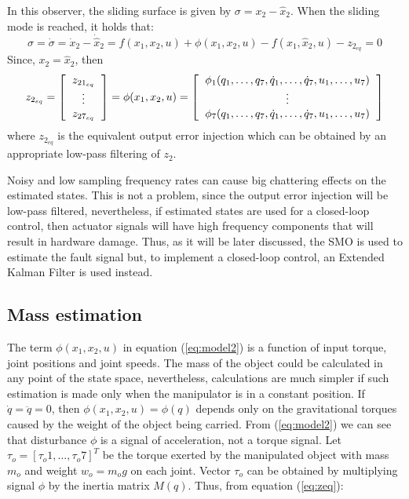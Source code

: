 \documentclass[a4paper, 10pt]{article}
\begin{document}
In this observer, the sliding surface is given by $\sigma = x_2 - \hat{x}_2$. When the sliding mode is reached, it holds that:
\[\sigma = \dot{\sigma} = \dot{x}_2 - \dot{\hat{x}}_2 = f(x_1, x_2, u) + \phi(x_1, x_2, u) - f(x_1, \hat{x}_2, u) - z_{2_{eq}} = 0\]
Since,  $x_2 = \hat{x}_2$, then
\begin{equation}
  z_{2_{eq}} = \left[\begin{tabular}{c}
      $z_{21_{eq}}$\\
      $\vdots$\\
      $z_{27_{eq}}$
    \end{tabular}\right] = \phi(x_1, x_2, u) =
  \left[\begin{tabular}{c}
      $\phi_1(q_1,\dots, q_7, \dot{q}_1, \dots, \dot{q}_7, u_1, \dots,u_7)$\\
      $\vdots$\\
      $\phi_7(q_1,\dots, q_7, \dot{q}_1, \dots, \dot{q}_7, u_1, \dots,u_7)$
    \end{tabular}\right]
  \label{eq:zeq}
\end{equation}
where $z_{2_{eq}}$ is the equivalent output error injection which can be obtained by an appropriate low-pass filtering of $z_2$.

Noisy and low sampling frequency rates can cause big chattering effects on the estimated states. This is not a problem, since the output error injection will be low-pass filtered, nevertheless, if estimated states are used for a closed-loop control, then actuator signals will have high frequency components that will result in hardware damage. Thus, as it will be later discussed, the SMO is used to estimate the fault signal but, to implement a closed-loop control, an Extended Kalman Filter is used instead. 

\subsection{Mass estimation}
The term $\phi(x_1, x_2, u)$ in equation (\ref{eq:model2}) is a function of input torque, joint positions and joint speeds. The mass of the object could be calculated in any point of the state space, nevertheless, calculations are much simpler if such estimation is made only when the manipulator is in a constant position. If $\dot{q}= \ddot{q} = 0$, then $\phi(x_1, x_2, u) = \phi(q)$ depends only on the gravitational torques caused by the weight of the object being carried. From (\ref{eq:model2}) we can see that disturbance $\phi$ is a signal of acceleration, not a torque signal. Let $\tau_o = [\tau_o1,\dots,\tau_o7]^T$ be the torque exerted by the manipulated object with mass $m_o$ and weight $w_o=m_o g$ on each joint. Vector $\tau_o$ can be obtained by multiplying signal $\phi$ by the inertia matrix $M(q)$. Thus, from equation (\ref{eq:zeq}):
\end{document}
